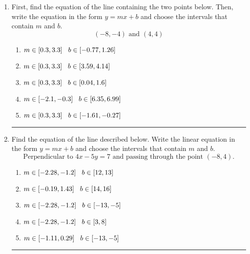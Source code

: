 \documentclass[14pt]{extbook}
\newcommand{\litem}[1]{\item#1\hspace*{-1cm}\rule{\textwidth}{0.4pt}}
\begin{document}
\begin{enumerate}
{\begin{enumerate}[label=\Alph*.]
\end{enumerate} }
\litem{
First, find the equation of the line containing the two points below. Then, write the equation in the form $ y=mx+b $ and choose the intervals that contain $m$ and $b$.\[ (-8, -4) \text{ and } (4, 4) \]\begin{enumerate}[label=\Alph*.]
\item \( m \in [0.3, 3.3] \hspace*{3mm} b \in [-0.77, 1.26] \)
\item \( m \in [0.3, 3.3] \hspace*{3mm} b \in [3.59, 4.14] \)
\item \( m \in [0.3, 3.3] \hspace*{3mm} b \in [0.04, 1.6] \)
\item \( m \in [-2.1, -0.3] \hspace*{3mm} b \in [6.35, 6.99] \)
\item \( m \in [0.3, 3.3] \hspace*{3mm} b \in [-1.61, -0.27] \)

\end{enumerate} }
\litem{
Find the equation of the line described below. Write the linear equation in the form $ y=mx+b $ and choose the intervals that contain $m$ and $b$.\[ \text{Perpendicular to } 4 x - 5 y = 7 \text{ and passing through the point } (-8, 4). \]\begin{enumerate}[label=\Alph*.]
\item \( m \in [-2.28, -1.2] \hspace*{3mm} b \in [12, 13] \)
\item \( m \in [-0.19, 1.43] \hspace*{3mm} b \in [14, 16] \)
\item \( m \in [-2.28, -1.2] \hspace*{3mm} b \in [-13, -5] \)
\item \( m \in [-2.28, -1.2] \hspace*{3mm} b \in [3, 8] \)
\item \( m \in [-1.11, 0.29] \hspace*{3mm} b \in [-13, -5] \)


\end{enumerate}}
\end{enumerate}
\end{document}
